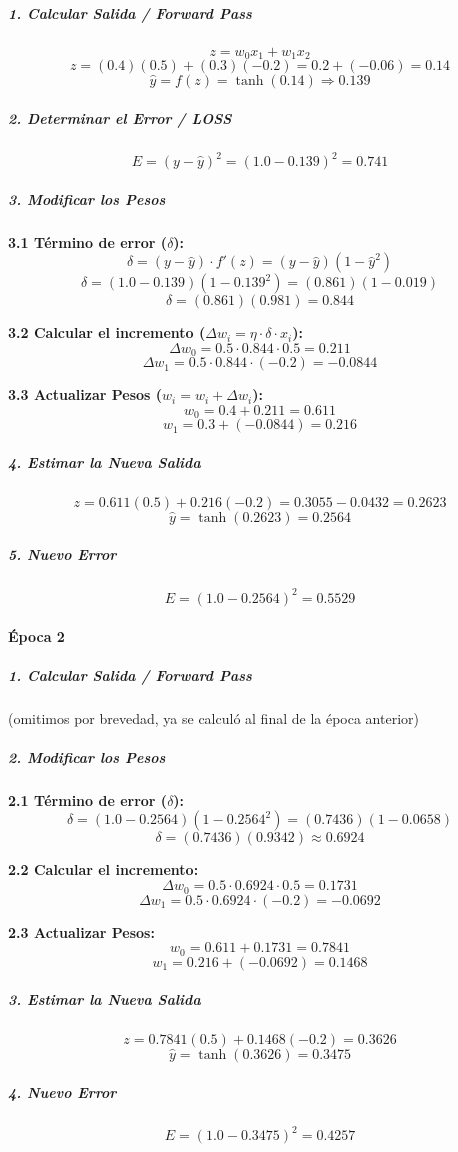 \documentclass[12pt]{article}
\begin{document}
\subparagraph{1. Calcular Salida / Forward Pass}
\[ z = w_{0}x_{1} + w_{1}x_{2} \]
\[ z = (0.4)(0.5) + (0.3)(-0.2) = 0.2 + (-0.06) = 0.14 \]
\[ \hat{y} = f(z) = \tanh(0.14) \Rightarrow 0.139 \]

\subparagraph{2. Determinar el Error / LOSS}
\[ E = (y - \hat{y})^2 = (1.0 - 0.139)^2 = 0.741 \]

\subparagraph{3. Modificar los Pesos}
\textbf{3.1 Término de error ($\delta$):}
\[ \delta = (y - \hat{y}) \cdot f'(z) = (y - \hat{y})(1 - \hat{y}^2) \]
\[ \delta = (1.0 - 0.139)(1 - 0.139^2) = (0.861)(1 - 0.019) \]
\[ \delta = (0.861)(0.981) = 0.844 \]

\textbf{3.2 Calcular el incremento ($\Delta w_i = \eta \cdot \delta \cdot x_i$):}
\[ \Delta w_{0} = 0.5 \cdot 0.844 \cdot 0.5 = 0.211 \]
\[ \Delta w_{1} = 0.5 \cdot 0.844 \cdot (-0.2) = -0.0844 \]

\textbf{3.3 Actualizar Pesos ($w_i = w_i + \Delta w_i$):}
\[ w_{0} = 0.4 + 0.211 = 0.611 \]
\[ w_{1} = 0.3 + (-0.0844) = 0.216 \]

\subparagraph{4. Estimar la Nueva Salida}
\[ z = 0.611(0.5) + 0.216(-0.2) = 0.3055 - 0.0432 = 0.2623 \]
\[ \hat{y} = \tanh(0.2623) = 0.2564 \]

\subparagraph{5. Nuevo Error}
\[ E = (1.0 - 0.2564)^2 = 0.5529 \]

\paragraph{Época 2}

\subparagraph{1. Calcular Salida / Forward Pass} (omitimos por brevedad, ya se calculó al final de la época anterior)

\subparagraph{2. Modificar los Pesos}
\textbf{2.1 Término de error ($\delta$):}
\[ \delta = (1.0 - 0.2564)(1 - 0.2564^2) = (0.7436)(1 - 0.0658) \]
\[ \delta = (0.7436)(0.9342) \approx 0.6924 \]

\textbf{2.2 Calcular el incremento:}
\[ \Delta w_{0} = 0.5 \cdot 0.6924 \cdot 0.5 = 0.1731 \]
\[ \Delta w_{1} = 0.5 \cdot 0.6924 \cdot (-0.2) = -0.0692 \]

\textbf{2.3 Actualizar Pesos:}
\[ w_{0} = 0.611 + 0.1731 = 0.7841 \]
\[ w_{1} = 0.216 + (-0.0692) = 0.1468 \]

\subparagraph{3. Estimar la Nueva Salida}
\[ z = 0.7841(0.5) + 0.1468(-0.2) = 0.3626 \]
\[ \hat{y} = \tanh(0.3626) = 0.3475 \]

\subparagraph{4. Nuevo Error}
\[ E = (1.0 - 0.3475)^2 = 0.4257 \]
\end{document}

